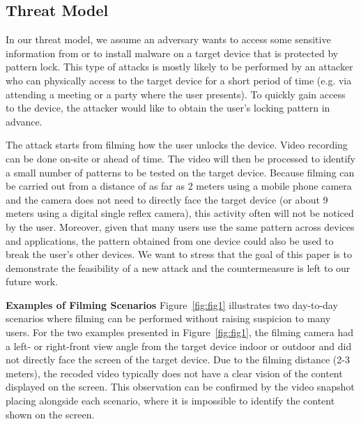     \subsection{Threat Model}
    \label{sec:scenarios}
        In our threat model, we assume an adversary wants to access some sensitive information from or to install malware on a
target device that is protected by pattern lock. This type of attacks is mostly likely to be performed by an attacker
who can physically access to the target device for a short period of time (e.g. via  attending a meeting or a party where
the user presents). To quickly gain access to the device, the attacker would like to obtain
the user's locking pattern in advance.

The attack starts from filming how the user unlocks the device. Video recording
can be done on-site or ahead of time. The video will then be processed to identify a small number of patterns to be
tested on the target device. Because filming can be carried out from a distance of as far as 2 meters using a
mobile phone camera and the camera does not need to directly face the target device (or about 9 meters using a digital single reflex camera), this activity often will not be
noticed by the user. Moreover, given that many users use the same pattern across devices and applications, the pattern
obtained from one device could also be used to break the user's other devices.  We want to stress that the goal of this paper is to
demonstrate the feasibility of a new attack and the countermeasure is left to our future work.

\noindent \textbf{Examples of Filming Scenarios}
Figure~\ref{fig:fig1} illustrates two day-to-day scenarios where filming can be
performed without raising suspicion to many users. For the two examples presented in Figure~\ref{fig:fig1}, the
filming camera had a left- or right-front view angle from the target device indoor or outdoor and did not directly face the screen of the target device. Due to the filming distance (2-3 meters), the recoded video typically does not have a clear vision of
the content displayed on the screen.  This observation can be confirmed by the video snapshot placing
alongside each scenario, where it is impossible to identify the content shown on the screen.



